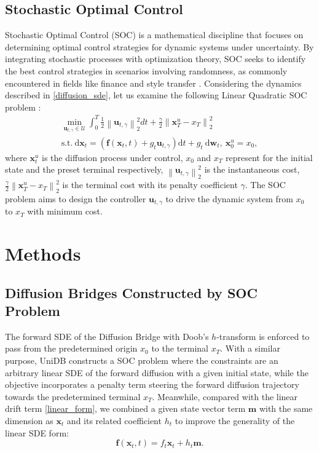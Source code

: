 \subsection{Stochastic Optimal Control}
Stochastic Optimal Control (SOC) is a mathematical discipline that focuses on determining optimal control strategies for dynamic systems under uncertainty. By integrating stochastic processes with optimization theory, SOC seeks to identify the best control strategies in scenarios involving randomness, as commonly encountered in fields like finance \cite{Geering2010} and style transfer \cite{RB}. Considering the dynamics described in \eqref{diffusion_sde}, let us examine the following Linear Quadratic SOC problem \cite{4310229, OConnell2003ConditionedRW, Kappen2008StochasticOC, chen2024generativemodelingphasestochastic}: 
\begin{equation}\label{control_problem_sde}
\begin{gathered}
\min_{\mathbf{u}_{t, \gamma} \in \mathcal{U}} \int_0^T \frac{1}{2} \left\|\mathbf{u}_{t, \gamma}\right\|_2^2 d t+\frac{\gamma}{2}\left\|\mathbf{x}_T^{u}-x_T\right\|_2^2 \\
\text{s.t.} \ \mathrm{d} \mathbf{x}_t = \left( \mathbf{f}(\mathbf{x}_t, t) + g_t \mathbf{u}_{t, \gamma} \right) \mathrm{d} t + g_t \mathrm{~d} \mathbf{w}_t, \ \mathbf{x}_0^u=x_0,
\end{gathered}
\end{equation}
where $\mathbf{x}_t^u$ is the diffusion process under control, $x_0$ and $x_T$ represent for the initial state and the preset terminal respectively, $\left\|\mathbf{u}_{t, \gamma}\right\|_2^2$ is the instantaneous cost, $\frac{\gamma}{2}\left\|\mathbf{x}_T^{u}-x_T\right\|_2^2$ is the terminal cost with its penalty coefficient $\gamma$. The SOC problem aims to design the controller $\mathbf{u}_{t, \gamma}$ to drive the dynamic system from $x_0$ to $x_T$ with minimum cost. 


\section{Methods}
\subsection{Diffusion Bridges Constructed by SOC Problem}
The forward SDE of the Diffusion Bridge with Doob’s $h$-transform is enforced to pass from the predetermined origin $x_0$ to the terminal $x_T$. With a similar purpose, UniDB constructs a SOC problem where the constraints are an arbitrary linear SDE of the forward diffusion with a given initial state, while the objective incorporates a penalty term steering the forward diffusion trajectory towards the predetermined terminal $x_T$. Meanwhile, compared with the linear drift term \eqref{linear_form}, we combined a given state vector term $\mathbf{m}$ with the same dimension as $\mathbf{x}_t$ and its related coefficient $h_t$ to improve the generality of the linear SDE form: 
\begin{equation}\label{generalized_linear_SDE}
\mathbf{f}(\mathbf{x}_t, t) = f_t \mathbf{x}_t + h_t \mathbf{m}.
\end{equation}

